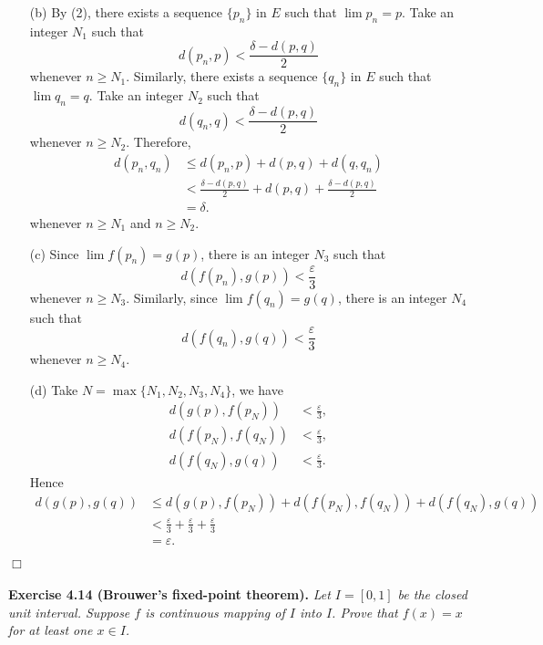 \documentclass{article}
\begin{document}
\begin{enumerate}
\begin{enumerate}
  \item[(b)]
  By (2), there exists a sequence $\{p_n\}$ in $E$ such that $\lim p_n = p$.
  Take an integer $N_1$ such that
  \[
    d(p_n,p) < \frac{\delta - d(p,q)}{2}
  \]
  whenever $n \geq N_1$.
  Similarly, there exists a sequence $\{q_n\}$ in $E$ such that $\lim q_n = q$.
  Take an integer $N_2$ such that
  \[
    d(q_n,q) < \frac{\delta - d(p,q)}{2}
  \]
  whenever $n \geq N_2$.
  Therefore,
  \begin{align*}
    d(p_n,q_n)
    &\leq d(p_n,p) + d(p,q) + d(q,q_n) \\
    &< \frac{\delta - d(p,q)}{2} + d(p,q) + \frac{\delta - d(p,q)}{2} \\
    &= \delta.
  \end{align*}
  whenever $n \geq N_1$ and $n \geq N_2$.

  \item[(c)]
  Since $\lim f(p_n) = g(p)$,
  there is an integer $N_3$ such that
  \[
    d(f(p_n), g(p)) < \frac{\varepsilon}{3}
  \]
  whenever $n \geq N_3$.
  Similarly,
  since $\lim f(q_n) = g(q)$,
  there is an integer $N_4$ such that
  \[
    d(f(q_n), g(q)) < \frac{\varepsilon}{3}
  \]
  whenever $n \geq N_4$.

  \item[(d)]
  Take $N = \max\{N_1,N_2,N_3,N_4\}$, we have
  \begin{align*}
    d(g(p),f(p_N)) & < \frac{\varepsilon}{3}, \\
    d(f(p_N),f(q_N)) &< \frac{\varepsilon}{3}, \\
    d(f(q_N),g(q)) & < \frac{\varepsilon}{3}.
  \end{align*}
  Hence
  \begin{align*}
    d(g(p),g(q))
    &\leq
    d(g(p),f(p_N)) + d(f(p_N),f(q_N)) + d(f(q_N),g(q)) \\
    &< \frac{\varepsilon}{3} + \frac{\varepsilon}{3} + \frac{\varepsilon}{3} \\
    &= \varepsilon.
  \end{align*}
  \end{enumerate}
\end{enumerate}
$\Box$ \\\\






\textbf{Exercise 4.14 (Brouwer's fixed-point theorem).}
\emph{Let $I=[0,1]$ be the closed unit interval.
Suppose $f$ is continuous mapping of $I$ into $I$.
Prove that $f(x) = x$ for at least one $x \in I$.} \\
\end{document}
